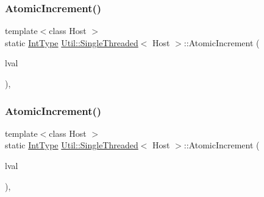 \mbox{\label{classUtil_1_1SingleThreaded_a72d41f77da5c6174b1ffb08cb21f1c39}} 
\subsubsection{\texorpdfstring{AtomicIncrement()}{AtomicIncrement()}\hspace{0.1cm}{\footnotesize\ttfamily [2/3]}}
{\footnotesize\ttfamily template$<$class Host $>$ \\
static \mbox{\hyperlink{classUtil_1_1SingleThreaded_a35932213fb0c15a7b67ced79bc2af4c6}{Int\+Type}} \mbox{\hyperlink{classUtil_1_1SingleThreaded}{Util\+::\+Single\+Threaded}}$<$ Host $>$\+::Atomic\+Increment (\begin{DoxyParamCaption}\item[{volatile \mbox{\hyperlink{classUtil_1_1SingleThreaded_a35932213fb0c15a7b67ced79bc2af4c6}{Int\+Type}} \&}]{lval }\end{DoxyParamCaption})\hspace{0.3cm}{\ttfamily [inline]}, {\ttfamily [static]}}

\mbox{\label{classUtil_1_1SingleThreaded_a72d41f77da5c6174b1ffb08cb21f1c39}} 
\subsubsection{\texorpdfstring{AtomicIncrement()}{AtomicIncrement()}\hspace{0.1cm}{\footnotesize\ttfamily [3/3]}}
{\footnotesize\ttfamily template$<$class Host $>$ \\
static \mbox{\hyperlink{classUtil_1_1SingleThreaded_a35932213fb0c15a7b67ced79bc2af4c6}{Int\+Type}} \mbox{\hyperlink{classUtil_1_1SingleThreaded}{Util\+::\+Single\+Threaded}}$<$ Host $>$\+::Atomic\+Increment (\begin{DoxyParamCaption}\item[{volatile \mbox{\hyperlink{classUtil_1_1SingleThreaded_a35932213fb0c15a7b67ced79bc2af4c6}{Int\+Type}} \&}]{lval }\end{DoxyParamCaption})\hspace{0.3cm}{\ttfamily [inline]}, {\ttfamily [static]}}

